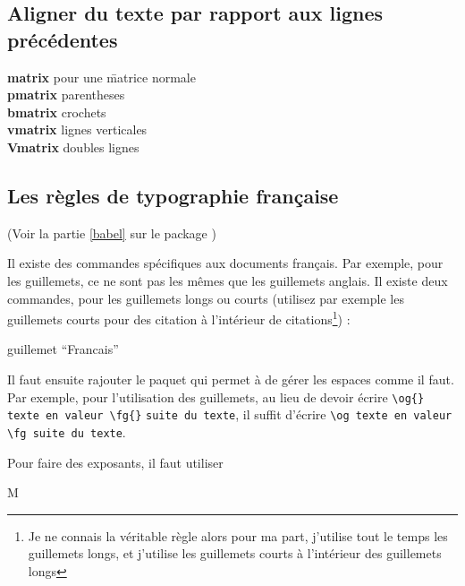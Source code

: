 \documentclass[a4paper,twoside]{article}
\begin{document}
\subsection{Aligner du texte par rapport aux lignes précédentes}
\begin{example}
\begin{tabbing}
\textbf{matrix} pour une \= matrice normale \\
\textbf{pmatrix} \> parentheses\\
\textbf{bmatrix} \> crochets\\
\textbf{vmatrix} \> lignes verticales\\
\textbf{Vmatrix} \> doubles lignes\\
\end{tabbing}

\end{example}

\subsection{Les règles de typographie française}

(Voir la partie \ref{babel} sur le package )

Il existe des commandes spécifiques aux documents français. Par exemple, pour les guillemets, ce ne sont pas les mêmes que les guillemets anglais. Il existe deux commandes, pour les guillemets longs ou courts (utilisez par exemple les guillemets courts pour des citation à l'intérieur de citations\footnote{Je ne connais la véritable règle alors pour ma part, j'utilise tout le temps les guillemets longs, et j'utilise les guillemets courts à l'intérieur des guillemets longs}) :
\begin{example}
\og guillemet ``Francais'' \fg
\end{example}

Il faut ensuite rajouter le paquet  qui permet à  de gérer les espaces comme il faut. Par exemple, pour l'utilisation des guillemets, au lieu de devoir écrire \verb|\og{} texte en valeur \fg{}| \verb|suite du texte|, il suffit d'écrire \verb|\og texte en valeur \fg suite du texte|.

\bigskip

Pour faire des exposants, il faut utiliser
\begin{example}
M
\end{example}
\end{document}
